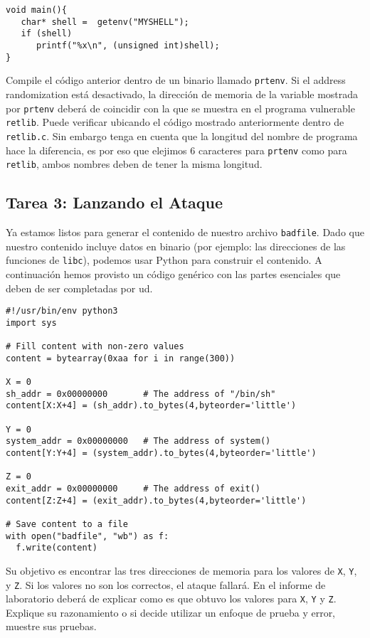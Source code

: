 \begin{lstlisting}
void main(){
   char* shell =  getenv("MYSHELL");
   if (shell) 
      printf("%x\n", (unsigned int)shell);
}
\end{lstlisting}

Compile el código anterior dentro de un binario llamado \texttt{prtenv}. 
Si el address randomization está desactivado, la dirección de memoria de la variable mostrada por \texttt{prtenv} deberá de coincidir con la que se muestra en el programa vulnerable \texttt{retlib}. Puede verificar ubicando el código mostrado anteriormente dentro de \texttt{retlib.c}. 
Sin embargo tenga en cuenta que la longitud del nombre de programa hace la diferencia, es por eso que elejimos 6 caracteres para \texttt{prtenv} como para 
\texttt{retlib}, ambos nombres deben de tener la misma longitud.



\subsection{Tarea 3: Lanzando el Ataque}

Ya estamos listos para generar el contenido de nuestro archivo \texttt{badfile}.
Dado que nuestro contenido incluye datos en binario (por ejemplo: las direcciones de las funciones de \texttt{libc}), podemos usar Python para construir el contenido.
A continuación hemos provisto un código genérico con las partes esenciales que deben de ser completadas por ud.


\begin{lstlisting}
#!/usr/bin/env python3
import sys

# Fill content with non-zero values
content = bytearray(0xaa for i in range(300))

X = 0
sh_addr = 0x00000000       # The address of "/bin/sh"
content[X:X+4] = (sh_addr).to_bytes(4,byteorder='little')

Y = 0
system_addr = 0x00000000   # The address of system()
content[Y:Y+4] = (system_addr).to_bytes(4,byteorder='little')

Z = 0
exit_addr = 0x00000000     # The address of exit()
content[Z:Z+4] = (exit_addr).to_bytes(4,byteorder='little')

# Save content to a file
with open("badfile", "wb") as f:
  f.write(content)
\end{lstlisting}
 
Su objetivo es encontrar las tres direcciones de memoria para los valores de \texttt{X}, \texttt{Y}, y \texttt{Z}. 
Si los valores no son los correctos, el ataque fallará. En el informe de laboratorio deberá de explicar como es que obtuvo los valores para {\tt X}, {\tt Y} y {\tt Z}. Explique su razonamiento o si decide utilizar un enfoque de prueba y error, muestre sus pruebas.


